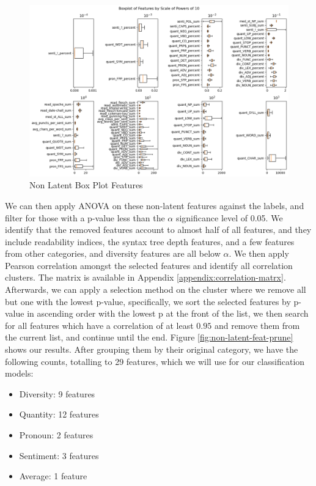 \documentclass{article}
\begin{document}
\begin{figure}[H]
  \centering
  \includegraphics[width=\textwidth]{img/non_latent_box_plot.png}
  \caption{Non Latent Box Plot Features}
  \label{box-plot}
\end{figure}

We can then apply ANOVA on these non-latent features against the labels, and filter for those with a p-value less than the $\alpha$ significance level of 0.05. We identify that the removed features account to almost half of all features, and they include readability indices, the syntax tree depth features, and a few features from other categories, and diversity features are all below $\alpha$. We then apply Pearson correlation amongst the selected features and identify all correlation clusters. The matrix is available in Appendix \ref{appendix:correlation-matrx}. Afterwards, we can apply a selection method on the cluster where we remove all but one with the lowest p-value, specifically, we sort the selected features by p-value in ascending order with the lowest p at the front of the list, we then search for all features which have a correlation of at least $0.95$ and remove them from the current list, and continue until the end. Figure \ref{fig:non-latent-feat-prune} shows our results. After grouping them by their original category, we have the following counts, totalling to 29 features, which we will use for our classification models:
\begin{itemize}
  \item Diversity: 9 features
  \item Quantity: 12 features
  \item Pronoun: 2 features
  \item Sentiment: 3 features
  \item Average: 1 feature
\end{itemize}
\end{document}
